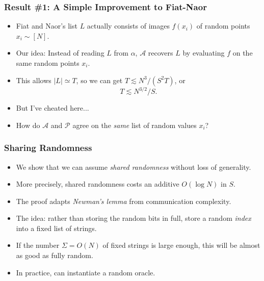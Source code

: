 \documentclass[usenames, dvipsnames, t, table]{beamer}
\newcommand{\inlineauthor}[1]{\raisebox{-0.5 \height}{\texttt{[image: assets/\#1]}}}
\newcommand{\A}{\mathcal{A}}
\renewcommand{\P}{\mathcal{P}}
\begin{document}
  \begin{frame}
    \frametitle{Result \#1: A Simple Improvement to Fiat-Naor}
    \begin{itemize}
    \item  Fiat and Naor's list $L$ actually consists of images $f(x_i)$ of random points $x_i \sim [N]$.
      \pause
    \item Our idea: Instead of reading $L$ from $\alpha$,
      $\A$ recovers $L$ by evaluating $f$ on the same random  points $x_i$.
      \pause
    \item This allows $|L| \simeq T$, so we can get $T \lesssim N^3 / (S^2 T)$, or
      \[
        T \lesssim N^{3/2} / S.
      \]
      \mypause
    \item But I've cheated here...
      \pause
    \item How do $\A$ and $\P$ agree on the \emph{same} list of random values $x_i$?
      \end{itemize}
  \end{frame}

  \begin{frame}
    \frametitle{Sharing Randomness}
    \begin{itemize}
    \item We show that we can assume \emph{shared randomness}  without loss of generality.
      \pause
    \item More precisely, shared randomness costs an additive $O(\log N)$ in $S$.
      \pause
    \item The proof adapts \emph{Newman's lemma} \cite{Newman91} \inlineauthor{newman} from communication complexity.
      \pause
    \item The idea: rather than storing the random bits in full, store a random \emph{index} into a fixed list of strings.
      \pause
    \item If the number $\Sigma = O(N)$ of fixed strings is large enough, this will be almost as good as fully random.
      \pause
    \item In practice, can instantiate a random oracle.
    \end{itemize}
  \end{frame}
\end{document}
